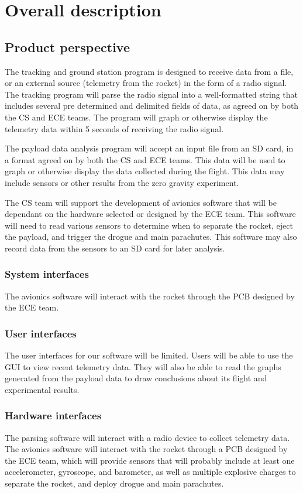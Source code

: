 \documentclass[onecolumn, draftclsnofoot, 10pt, compsoc]{IEEEtran}
\begin{document}
\section{Overall description}
\subsection{Product perspective}
The tracking and ground station program is designed to receive data from a file, or an external source (telemetry from the rocket) in the form of a radio signal. The tracking program will parse the radio signal into a well-formatted string that includes several pre determined and delimited fields of data, as agreed on by both the CS and ECE teams. The program will graph or otherwise display the telemetry data within 5 seconds of receiving the radio signal.

The payload data analysis program will accept an input file from an SD card, in a format agreed on by both the CS and ECE teams.  This data will be used to graph or otherwise display the data collected during the flight. This data may include sensors or other results from the zero gravity experiment.

The CS team will support the development of avionics software that will be dependant on the hardware selected or designed by the ECE team. This software will need to read various sensors to determine when to separate the rocket, eject the payload, and trigger the drogue and main parachutes.  This software may also record data from the sensors to an SD card for later analysis.

\subsubsection{System interfaces}
The avionics software will interact with the rocket through the PCB designed by the ECE team.

\subsubsection{User interfaces}
The user interfaces for our software will be limited. Users will be able to use the GUI to view recent telemetry data. They will also be able to read the graphs generated from the payload data to draw conclusions about its flight and experimental results.

\subsubsection{Hardware interfaces}
The parsing software will interact with a radio device to collect telemetry data.  The avionics software will interact with the rocket through a PCB designed by the ECE team, which will provide sensors that will probably include at least one accelerometer, gyroscope, and barometer, as well as multiple explosive charges to separate the rocket, and deploy drogue and main parachutes.
\end{document}
